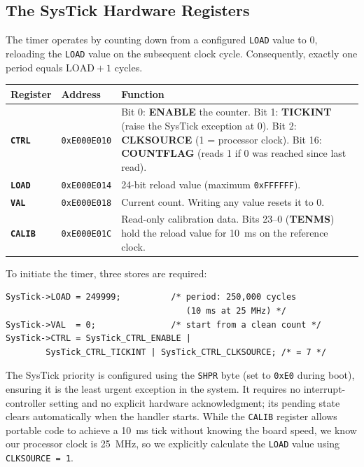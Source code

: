 \subsection{The SysTick Hardware Registers}
The timer operates by counting down from a configured \texttt{LOAD} value to 0, reloading the \texttt{LOAD} value on the subsequent clock cycle. Consequently, exactly one period equals $\text{LOAD} + 1$ cycles.

\begin{table}[h!]
    \centering
    \begin{tabular}{llp{9cm}}
        \toprule
        \textbf{Register} & \textbf{Address} & \textbf{Function} \\
        \midrule
        \textbf{\texttt{CTRL}} & \texttt{0xE000E010} & Bit 0: \textbf{ENABLE} the counter. Bit 1: \textbf{TICKINT} (raise the SysTick exception at 0). Bit 2: \textbf{CLKSOURCE} (1 = processor clock). Bit 16: \textbf{COUNTFLAG} (reads 1 if 0 was reached since last read). \\
        \textbf{\texttt{LOAD}} & \texttt{0xE000E014} & 24-bit reload value (maximum \texttt{0xFFFFFF}). \\
        \textbf{\texttt{VAL}} & \texttt{0xE000E018} & Current count. Writing any value resets it to 0. \\
        \textbf{\texttt{CALIB}} & \texttt{0xE000E01C} & Read-only calibration data. Bits 23--0 (\textbf{TENMS}) hold the reload value for 10~ms on the reference clock. \\
        \bottomrule
    \end{tabular}
\end{table}

To initiate the timer, three stores are required:
\begin{lstlisting}
SysTick->LOAD = 249999;          /* period: 250,000 cycles 
                                    (10 ms at 25 MHz) */
SysTick->VAL  = 0;               /* start from a clean count */
SysTick->CTRL = SysTick_CTRL_ENABLE | 
        SysTick_CTRL_TICKINT | SysTick_CTRL_CLKSOURCE; /* = 7 */
\end{lstlisting}

The SysTick priority is configured using the \texttt{SHPR} byte (set to \texttt{0xE0} during boot), ensuring it is the least urgent exception in the system. It requires no interrupt-controller setting and no explicit hardware acknowledgment; its pending state clears automatically when the handler starts. While the \texttt{CALIB} register allows portable code to achieve a 10~ms tick without knowing the board speed, we know our processor clock is 25~MHz, so we explicitly calculate the \texttt{LOAD} value using \texttt{CLKSOURCE = 1}.

